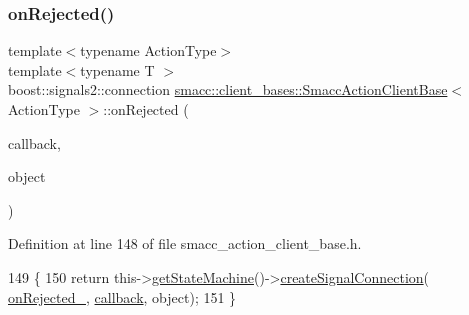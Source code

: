 \subsubsection{\texorpdfstring{on\+Rejected()}{onRejected()}\hspace{0.1cm}{\footnotesize\ttfamily [1/2]}}
{\footnotesize\ttfamily template$<$typename Action\+Type$>$ \\
template$<$typename T $>$ \\
boost\+::signals2\+::connection \hyperlink{classsmacc_1_1client__bases_1_1SmaccActionClientBase}{smacc\+::client\+\_\+bases\+::\+Smacc\+Action\+Client\+Base}$<$ Action\+Type $>$\+::on\+Rejected (\begin{DoxyParamCaption}\item[{void(T\+::$\ast$)(Result\+Const\+Ptr \&)}]{callback,  }\item[{T $\ast$}]{object }\end{DoxyParamCaption})\hspace{0.3cm}{\ttfamily [inline]}}



Definition at line 148 of file smacc\+\_\+action\+\_\+client\+\_\+base.\+h.


\begin{DoxyCode}
149     \{
150         \textcolor{keywordflow}{return} this->\hyperlink{classsmacc_1_1ISmaccClient_aec51d4712404cb9882b86e4c854bb93a}{getStateMachine}()->\hyperlink{classsmacc_1_1ISmaccStateMachine_adf0f42ade0c65cc471960fe2a7c42da2}{createSignalConnection}(
      \hyperlink{classsmacc_1_1client__bases_1_1SmaccActionClientBase_a4c878cbf2684701323e2b36668f7d721}{onRejected\_}, \hyperlink{servers_2opencv__perception__node_2opencv__perception__node_8cpp_a050e697bd654facce10ea3f6549669b3}{callback}, \textcolor{keywordtype}{object});
151     \}
\end{DoxyCode}
\mbox{\label{classsmacc_1_1client__bases_1_1SmaccActionClientBase_af6f191d1b1612d57082aa278db1f7be4}} 
